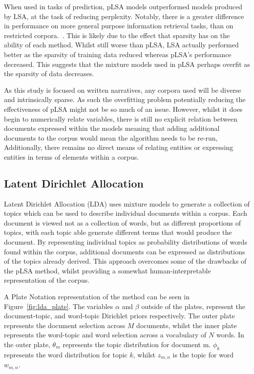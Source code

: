 \documentclass[10pt]{report}
\begin{document}
When used in tasks of prediction, pLSA models outperformed models produced by LSA, at the task of reducing perplexity. Notably, there is a greater difference in performance on more general purpose information retrieval tasks, than on restricted corpora.~\cite{Hofmann1999-qb}. This is likely due to the effect that sparsity has on the ability of each method. Whilst still worse than pLSA, LSA actually performed better as the sparsity of training data reduced whereas pLSA’s performance decreased. This suggests that the mixture models used in pLSA perhaps overfit as the sparsity of data decreases.

As this study is focused on written narratives, any corpora used will be diverse and intrinsically sparse. As such the overfitting problem potentially reducing the effectiveness of pLSA might not be so much of an issue. However, whilst it does begin to numerically relate variables, there is still no explicit relation between documents expressed within the models meaning that adding additional documents to the corpus would mean the algorithm needs to be re-run, Additionally, there remains no direct means of relating entities or expressing entities in terms of elements within a corpus.

\subsection{Latent Dirichlet Allocation}
Latent Dirichlet Allocation (LDA) uses mixture models to generate a collection of topics which can be used to describe individual documents within a corpus. Each document is viewed not as a collection of words, but as different proportions of topics, with each topic able generate different terms that would produce the document. By representing individual topics as probability distributions of words found within the corpus, additional documents can be expressed as distributions of the topics already derived. This approach overcomes some of the drawbacks of the pLSA method, whilst providing a somewhat human-interpretable representation of the corpus.~\cite{Blei2003-dj}

A Plate Notation representation of the method can be seen in Figure~\ref{fig:lda_plate}. The variables $\alpha$ and $\beta$ outside of the plates, represent the document-topic, and word-topic Dirichlet priors respectively. The outer plate represents the document selection across $M$ documents, whilst the inner plate represents the word-topic and word selection across a vocabulary of $N$ words. In the outer plate, $\theta_m$ represents the topic distribution for document m. $\phi_k$ represents the word distribution for topic $k$, whilst $z_{m,n}$ is the topic for word $w_{m,n}$.
\end{document}

